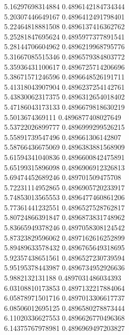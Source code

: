 {5.16297698314884 0.4896142184734344 \\
5.20307446649167 0.4896412491798401 \\
5.22464818881508 0.4896137416362762 \\
5.25281847695624 0.4895977377891541 \\
5.28144706604962 0.4896219968795776 \\
5.31667085515346 0.4896579384803772 \\
5.35936431100617 0.4896725714206696 \\
5.38671571246596 0.4896648526191711 \\
5.41318043907904 0.4896237254142761 \\
5.43830062317375 0.4896312654018402 \\
5.47186043173133 0.4896679818630219 \\
5.5013674369111 0.4896877408027649 \\
5.53722026899777 0.4896999299526215 \\
5.55891739547496 0.489661306142807 \\
5.58766436675069 0.4896383881568909 \\
5.61594341040836 0.4896600842475891 \\
5.65199315896098 0.4896906912326813 \\
5.69474452689246 0.489701509475708 \\
5.72231114952865 0.4896905720233917 \\
5.74853013565553 0.4896477460861206 \\
5.77361441232551 0.4896527528762817 \\
5.80724866391847 0.4896873831748962 \\
5.83665949378246 0.4897058308124542 \\
5.87323829596062 0.4897162616252899 \\
5.89489633578432 0.4896765649318695 \\
5.92357438651561 0.4896527230739594 \\
5.95195378443987 0.4896734952926636 \\
5.9882132131188 0.4897031486034393 \\
6.03108810173853 0.4897132217884064 \\
6.05878971501716 0.4897013306617737 \\
6.08506012695125 0.4896580278873444 \\
6.11020336627553 0.4896626770496368 \\
6.14375767978981 0.4896969497203827 \\
}
